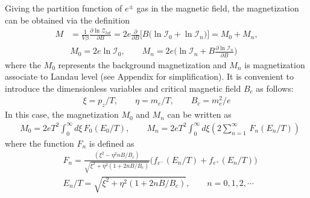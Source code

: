 \documentclass[sn-mathphys,Numbered]{sn-jnl}
\begin{document}
Giving the partition function of $e^\pm$ gas in the magnetic field, the magnetization can be obtained via the definition
\begin{align}
M&=\frac{1}{V\beta}\frac{\partial \ln \mathcal{Z}_{tot}}{\partial B}=2e\frac{\partial}{\partial B}\bigg[B\bigg(\ln\mathcal{I}_{0}+\ln\mathcal{I}_{n}\bigg)\bigg]=M_0+M_n,\\
&M_0=2e\ln\mathcal{I}_{0},\qquad
\label{M_landau}
M_n=2e\bigg(\ln\mathcal{I}_{n}+B\frac{\partial\ln\mathcal{I}_n}{\partial B}\bigg)
\end{align}
where the $M_0$ represents the background magnetization  and $M_n$ is magnetization associate to Landau level (see Appendix for simplification). It is convenient to introduce the dimensionless variables and critical magnetic field $B_c$ as follows:
\begin{align}
\xi=p_z/T,\qquad \eta=m_e/T,\qquad B_c=m^2_e/e
\end{align}
In this case, the magnetization $M_0$ and $M_n$ can be written as
\begin{align}
&M_0=2eT^2\int_0^\infty\!\!d\xi\, F_0(E_0/T),\qquad M_n=2eT^2\int_{0}^\infty\!\!d\xi\left(2\sum_{n=1}^\infty\,F_n(E_n/T)\right)
\end{align}
where the function $F_n$ is defined as
\begin{align}
&F_n=\frac{(\xi^2-\eta^2nB/B_c)}{\sqrt{\xi^2+\eta^2\left(1+2nB/B_c\right)}}\bigg(f_{e^-}(E_n/T)+f_{e^+}(E_n/T)\bigg)\\
&E_n/T=\sqrt{\xi^2+\eta^2\left(1+2nB/B_c\right)},\qquad n=0,1,2,\cdots
\end{align}
\end{document}
